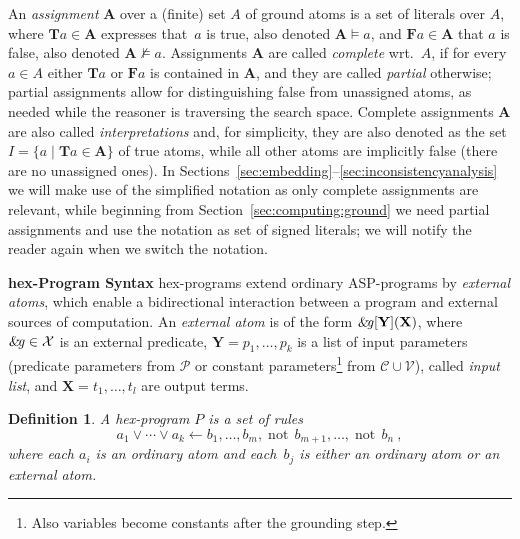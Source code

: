 \documentclass[11pt,fleqn,twoside]{article}
\newcommand{\leanparagraph}[1]{\smallskip\noindent\textbf{#1}}
\renewcommand{\vec}[1]{\ensuremath{\mb{#1}}}
\newcommand{\mb}[1]{\ensuremath{\mathbf{#1}}}
\def\naf{\ensuremath{\mathop{not}}}
\newcommand\hex{{\sc hex}\xspace}
\newcommand{\amp}[1]{\ensuremath{\text{\textsl{{\&}}}\!\mathit{#1}}}
\newcommand{\ext}[3]{\ensuremath{\amp{#1}[#2](#3)}}
\newcommand{\T}{\mathbf{T}}
\newcommand{\F}{\mathbf{F}}
\newcommand{\Assignment}{\ensuremath{\mathbf{A}}}
\newcommand{\Program}{\ensuremath{P}}
\newtheorem{definition}{Definition}
\begin{document}
		An {\em assignment} $\Assignment$ over a (finite) set $A$ of ground atoms 
		is a set of literals over $A$,
		where $\T a \in \Assignment$ expresses that~$a$ is true, also denoted $\Assignment \models a$, and $\F a \in \Assignment$ that $a$ is false, also denoted $\Assignment \not\models a$.
		Assignments $\Assignment$ are called \emph{complete} wrt.~$A$, if for every $a \in A$ either $\T a$ or $\F a$ is contained in $\Assignment$,
		and they are called \emph{partial} otherwise; partial assignments allow for distinguishing false from unassigned atoms, as needed while the reasoner is traversing the search space.
		Complete assignments $\Assignment$ are also called \emph{interpretations} and, for simplicity, they are also denoted as the set $I = \{ a \mid \T a \in \Assignment \}$ of true atoms,
		while all other atoms are implicitly false (there are no unassigned ones).
		In Sections~\ref{sec:embedding}--\ref{sec:inconsistencyanalysis}
		we will make use of the simplified notation as only complete assignments are relevant,
		while beginning from Section~\ref{sec:computing:ground} we need partial assignments and use the notation as set of signed literals;
		we will notify the reader again when we switch the notation.

		\leanparagraph{\hex-Program Syntax}
		\hex-programs extend ordinary ASP-programs by \emph{external atoms},
		which enable a bidirectional interaction between a program
		and external sources of computation.
		An \emph{external atom} is of the form 
		$\ext{g}{\vec{Y}}{\vec{X}}$,
		where $\amp{g} \in \mathcal{X}$ is an external predicate,
		$\vec{Y} = p_1, \dotsc, p_k$ is a list of input parameters
		(predicate parameters from $\mathcal{P}$ or constant parameters\footnote{Also variables become constants after the grounding step.}
		from $\mathcal{C} \cup \mathcal{V}$), called \emph{input list},
		and $\vec{X} = t_1, \dotsc, t_l$ are output terms.

		\begin{definition}
			\label{def:rule}
			A \hex-program $\Program$ is a set of rules
			\begin{equation*}
				\label{eq:rule}
			  a_1\lor\cdots\lor a_k \leftarrow b_1,\dotsc, b_m, \naf\, b_{m+1}, \dotsc, \naf\, b_n \ ,
			\end{equation*}
			where each $a_i$ is an ordinary atom and each~$b_j$
			is either an ordinary atom or an external atom.
		\end{definition}
	
\end{document}
